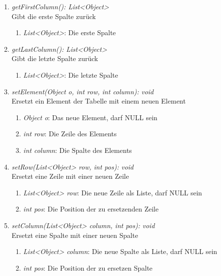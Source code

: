 \begin{enumerate}[+]
	\item \textit{getFirstColumn(): List<Object>} \\
	Gibt die erste Spalte zurück
	\vspace{-0.2cm}
	\begin{enumerate}[$\circ$]
		\item \textit{List<Object>}: Die erste Spalte
	\end{enumerate}
	
	\item \textit{getLastColumn(): List<Object>} \\
	Gibt die letzte Spalte zurück
	\vspace{-0.2cm}
	\begin{enumerate}[$\circ$]
		\item \textit{List<Object>}: Die letzte Spalte
	\end{enumerate}
	
	\item \textit{setElement(Object o, int row, int column): void} \\
	Ersetzt ein Element der Tabelle mit einem neuen Element
	\begin{enumerate}[$\bullet$]
		\item \textit{Object o}: Das neue Element, darf NULL sein
		\item \textit{int row}: Die Zeile des Elements
		\item \textit{int column}: Die Spalte des Elements
	\end{enumerate}
	\vspace{-0.2cm}
	
	\item \textit{setRow(List<Object> row, int pos): void} \\
	Ersetzt eine Zeile mit einer neuen Zeile
	\begin{enumerate}[$\bullet$]
		\item \textit{List<Object> row}: Die neue Zeile als Liste, darf NULL sein
		\item \textit{int pos}: Die Position der zu ersetzenden Zeile
	\end{enumerate}
	\vspace{-0.2cm}
	
	\item \textit{setColumn(List<Object> column, int pos): void} \\
	Ersetzt eine Spalte mit einer neuen Spalte
	\begin{enumerate}[$\bullet$]
		\item \textit{List<Object> column}: Die neue Spalte als Liste, darf NULL sein
		\item \textit{int pos}: Die Position der zu ersetzen Spalte
	\end{enumerate}
	\vspace{-0.2cm}
	

\end{enumerate}
